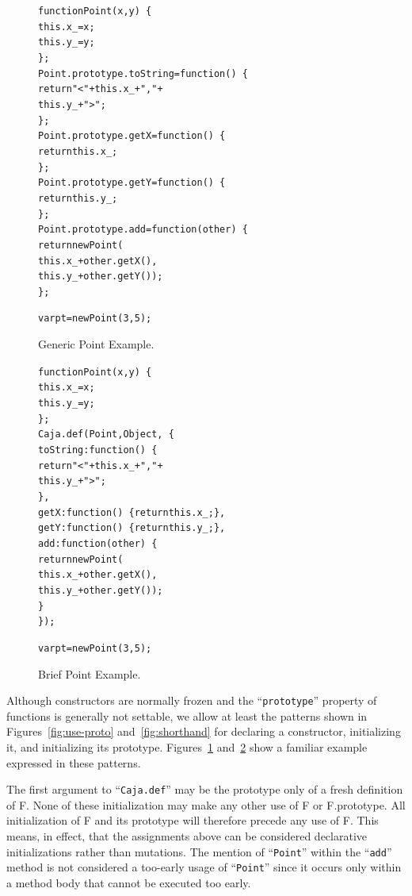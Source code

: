 \documentclass[letterpaper,twocolumn,10pt]{article}
\newcommand{\code}[1]{{\tt {#1}}}              %
\begin{document}
\begin{figure}
\begin{alltt}
function Point(x, y)\ \{
  this.x\_ = x;
  this.y\_ = y;
\};
Point.prototype.toString = function()\ \{ 
  return "<" + this.x\_ + "," + 
               this.y\_ + ">"; 
\};
Point.prototype.getX = function()\ \{ 
  return this.x\_; 
\};
Point.prototype.getY = function()\ \{ 
  return this.y\_; 
\};
Point.prototype.add = function(other)\ \{
  return new Point(
    this.x\_ + other.getX(),
    this.y\_ + other.getY());
\};

var pt = new Point(3, 5);
\end{alltt}

\caption[Generic Point Example.]{Generic Point Example.}
\label{fig:generic-point}
\end{figure}



\begin{figure}
\begin{alltt}
function Point(x, y)\ \{
  this.x\_ = x;
  this.y\_ = y;
\};
Caja.def(Point, Object,\ \{
  toString: function()\ \{ 
    return "<" + this.x\_ + "," + 
                 this.y\_ + ">"; 
  \},
  getX: function()\ \{ return this.x\_; \},
  getY: function()\ \{ return this.y\_; \},
  add: function(other)\ \{
    return new Point(
      this.x\_ + other.getX(),
      this.y\_ + other.getY());
  \}
\});

var pt = new Point(3, 5);
\end{alltt}

\caption[Brief Point Example.]{Brief Point Example.}
\label{fig:brief-point}
\end{figure}

Although constructors are normally frozen and the ``\code{prototype}'' 
property of functions is generally not settable, we allow at least the 
patterns shown in Figures~\ref{fig:use-proto} and~\ref{fig:shorthand} for 
declaring a constructor, initializing it, and initializing its prototype. 
Figures~\ref{fig:generic-point} and~\ref{fig:brief-point} show a familiar 
example expressed in these patterns.

The first argument to ``\code{Caja.def}'' may be the prototype only of a 
fresh definition of F. None of these initialization may make any other use of 
F or F.prototype. All initialization of F and its prototype will therefore 
precede any use of F. This means, in effect, that the assignments above can 
be considered declarative initializations rather than mutations. The mention 
of ``\code{Point}'' within the ``\code{add}'' method is not considered a 
too-early usage of ``\code{Point}'' since it occurs only within a method body 
that cannot be executed too early.
\end{document}
